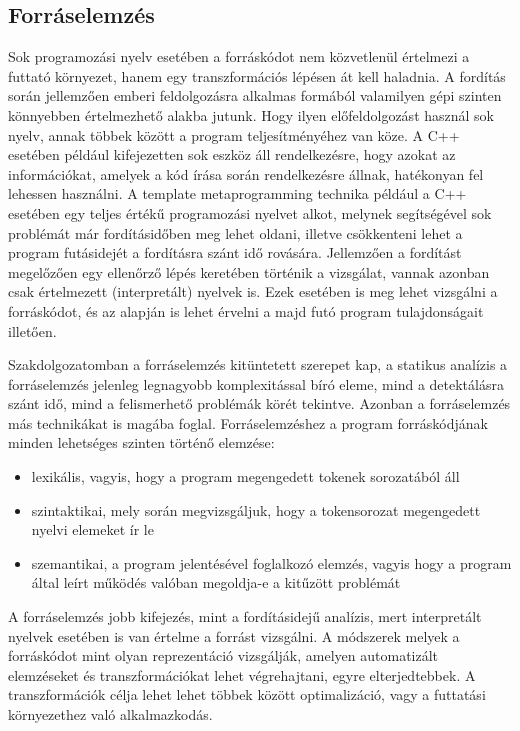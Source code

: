 \documentclass[a4paper,12pt]{report}
\begin{document}
\subsection{Forráselemzés}
Sok programozási nyelv esetében a forráskódot nem közvetlenül értelmezi a futtató környezet, hanem egy transzformációs lépésen át kell haladnia. A fordítás során jellemzően emberi feldolgozásra alkalmas formából valamilyen gépi szinten könnyebben értelmezhető alakba jutunk. Hogy ilyen előfeldolgozást használ sok nyelv, annak többek között a program teljesítményéhez van köze. A C++ esetében például kifejezetten sok eszköz áll rendelkezésre, hogy azokat az információkat, amelyek a kód írása során rendelkezésre állnak, hatékonyan fel lehessen használni. A template metaprogramming technika például a C++ esetében egy teljes értékű programozási nyelvet alkot, melynek segítségével sok problémát már fordításidőben meg lehet oldani, illetve csökkenteni lehet a program futásidejét a fordításra szánt idő rovására.
Jellemzően a fordítást megelőzően egy ellenőrző lépés keretében történik a vizsgálat, vannak azonban csak értelmezett (interpretált) nyelvek is. Ezek esetében is meg lehet vizsgálni a forráskódot, és az alapján is lehet érvelni a majd futó program tulajdonságait illetően.

Szakdolgozatomban a forráselemzés kitüntetett szerepet kap, a statikus analízis a forráselemzés jelenleg legnagyobb komplexitással bíró eleme, mind a detektálásra szánt idő, mind a felismerhető problémák körét tekintve. Azonban a forráselemzés más technikákat is magába foglal. Forráselemzéshez a program forráskódjának minden lehetséges szinten történő elemzése:
\begin{itemize}
\item lexikális, vagyis, hogy a program megengedett tokenek sorozatából áll
\item szintaktikai, mely során megvizsgáljuk, hogy a tokensorozat megengedett nyelvi elemeket ír le
\item szemantikai, a program jelentésével foglalkozó elemzés, vagyis hogy a program által leírt működés valóban megoldja-e a kitűzött problémát
\end{itemize}
A forráselemzés jobb kifejezés, mint a fordításidejű analízis, mert interpretált nyelvek esetében is van értelme a forrást vizsgálni. A módszerek melyek a forráskódot mint olyan reprezentáció vizsgálják, amelyen automatizált elemzéseket és transzformációkat \cite{interpretedtransforms} lehet végrehajtani, egyre elterjedtebbek. A transzformációk célja lehet lehet többek között optimalizáció, vagy a futtatási környezethez való alkalmazkodás.
\end{document}
